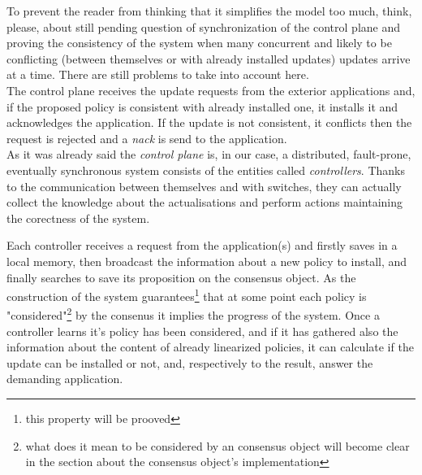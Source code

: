 \documentclass{article}
\begin{document}
To prevent the reader from thinking that it simplifies the model too much, think, please, about still pending question of synchronization of the control plane and proving the consistency of the system when many concurrent and likely to be conflicting (between themselves or with already installed updates) updates arrive at a time. There are still problems to take into account here.\\
The control plane receives the update requests from the exterior applications and, if the proposed policy is consistent with already installed one, it installs it and acknowledges the application. If the update is not consistent, it conflicts then the request is rejected and a \emph{nack} is send to the application. \\
As it was already said the \emph{control plane} is, in our case, a distributed, fault-prone, eventually synchronous system consists of the entities called \emph{controllers}. Thanks to the communication between themselves and with switches, they can actually collect the knowledge about the actualisations and perform actions maintaining the corectness of the system. 


Each controller receives a request from the application(s) and firstly saves in a local memory, then broadcast the information about a new policy to install, and finally searches to save its proposition on the consensus object. As the construction of the system guarantees\footnote{this property will be prooved} that at some point each policy is "considered"\footnote{what does it mean to be considered by an consensus object will become clear in the section about the consensus object's implementation} by the consenus it implies the progress of the system. Once a controller learns it's policy has been considered, and if it has gathered also the information about the content of already linearized policies, it can calculate if the  update can be installed  or not, and, respectively to the result, answer the demanding application.  \\
\end{document}
